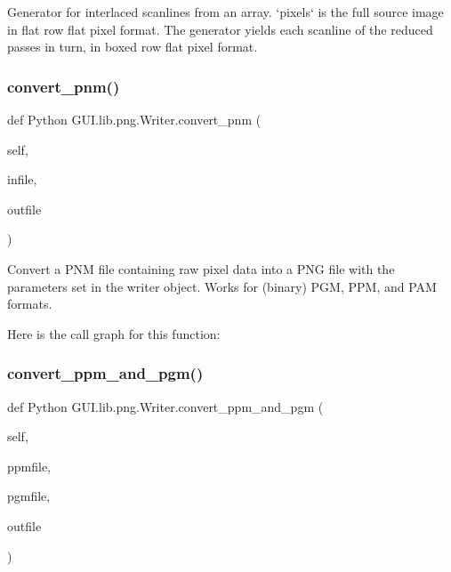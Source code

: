 \begin{DoxyVerb}Generator for interlaced scanlines from an array.  `pixels` is
the full source image in flat row flat pixel format.  The
generator yields each scanline of the reduced passes in turn, in
boxed row flat pixel format.
\end{DoxyVerb}
 \mbox{\label{class_python_01_g_u_i_1_1lib_1_1png_1_1_writer_ae37b9a6957f341eac4c52bbfc2fec9a7}} 
\subsubsection{\texorpdfstring{convert\+\_\+pnm()}{convert\_pnm()}}
{\footnotesize\ttfamily def Python G\+U\+I.\+lib.\+png.\+Writer.\+convert\+\_\+pnm (\begin{DoxyParamCaption}\item[{}]{self,  }\item[{}]{infile,  }\item[{}]{outfile }\end{DoxyParamCaption})}

\begin{DoxyVerb}Convert a PNM file containing raw pixel data into a PNG file
with the parameters set in the writer object.  Works for
(binary) PGM, PPM, and PAM formats.
\end{DoxyVerb}
 Here is the call graph for this function\+:
\mbox{\label{class_python_01_g_u_i_1_1lib_1_1png_1_1_writer_a3bccc8e12fde8099327276954f09b382}} 
\subsubsection{\texorpdfstring{convert\+\_\+ppm\+\_\+and\+\_\+pgm()}{convert\_ppm\_and\_pgm()}}
{\footnotesize\ttfamily def Python G\+U\+I.\+lib.\+png.\+Writer.\+convert\+\_\+ppm\+\_\+and\+\_\+pgm (\begin{DoxyParamCaption}\item[{}]{self,  }\item[{}]{ppmfile,  }\item[{}]{pgmfile,  }\item[{}]{outfile }\end{DoxyParamCaption})}

